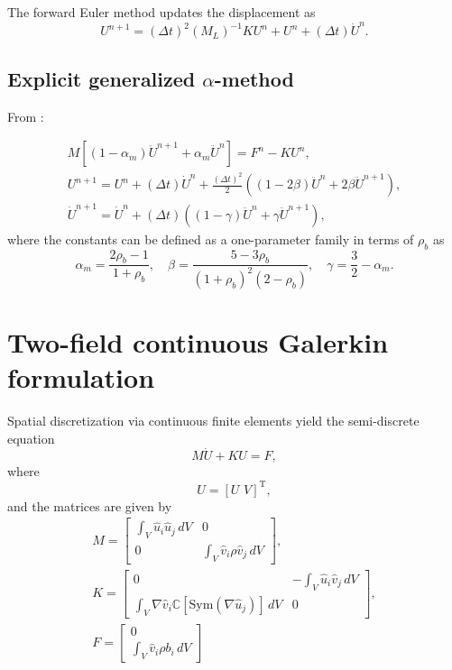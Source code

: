 \documentclass[12pt]{article}
\newcommand{\transpose}[1]{\ensuremath{{#1}^{\text{T}}}} %
\newcommand{\inverse}[1]{\ensuremath{{#1}^{-1}}} %
\newcommand{\Sym}{\ensuremath{\mathrm{Sym}}} %
\begin{document}
The forward Euler method updates the displacement as
\begin{equation}
\label{eq:ForwardEuler}
U^{n+1} = (\Delta t)^2 \inverse{(M_L)}K U^n + U^n + (\Delta t)\dot{U}^n.
\end{equation}

\subsection{Explicit generalized $\alpha$-method}

From \cite{Hulbert1996}:

\begin{eqnarray}
M[(1-\alpha_m)\ddot{U}^{n+1} + \alpha_m \ddot{U}^n]
= F^n - KU^n, 
%
\\
%
U^{n+1} = U^n + (\Delta t)\dot{U}^n + \frac{(\Delta t)^2}{2} 
\left( (1-2\beta)\ddot{U}^n + 2\beta \ddot{U}^{n+1}\right),
%
\\
%
\dot{U}^{n+1} = \dot{U}^n + (\Delta t)((1-\gamma)\ddot{U}^n + \gamma \ddot{U}^{n+1}),
\end{eqnarray}
%
where the constants can be defined as a one-parameter family in terms
of $\rho_b$ as
\begin{equation}
\alpha_m = \frac{2\rho_b-1}{1+\rho_b},
\quad
\beta = \frac{5-3\rho_b}{(1+\rho_b)^2(2-\rho_b)},
\quad
\gamma = \frac{3}{2}-\alpha_m.
\end{equation}

\section{Two-field continuous Galerkin formulation}

Spatial discretization via continuous finite elements yield the semi-discrete equation
\begin{equation}
\label{eq:2f_EOM}
M \dot{U} + K U  = F,
\end{equation}
where 
\begin{equation}
U = \transpose{[U \,\, V]},
\end{equation}
and the matrices are given by
\begin{multline}
\label{eq:2f_matrices}
M = \left[
\begin{array}{cc}
\int_V \hat{u}_i \hat{u}_j \, dV & 0 \\
0 & \int_V \hat{v}_i \rho \hat{v}_j \, dV
\end{array}
\right],
\\
K = \left[
\begin{array}{cc}
0 & - \int_V \hat{u}_i \hat{v}_j\, dV \\
\int_V \nabla \hat{v}_i \mathbb{C} [\Sym(\nabla \hat{u}_j)] \, dV & 0
\end{array}
\right],
\\
F = \left[
\begin{array}{c}
0 \\
\int_V  \hat{v}_i \rho b_i \, dV
\end{array}
\right]
\end{multline}
\end{document}
